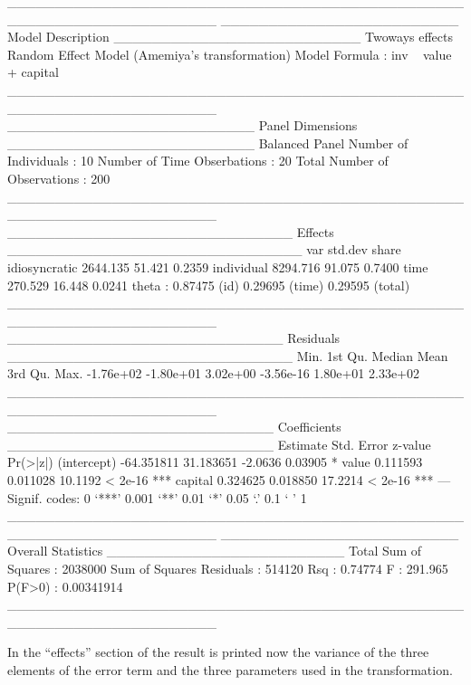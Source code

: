 \documentclass{article}
\begin{document}
\begin{Schunk}
\begin{Soutput}
______________________________________________________________________ 
_________________________ Model Description __________________________
Twoways effects
Random Effect Model (Amemiya's transformation)
Model Formula            : inv ~ value + capital
______________________________________________________________________ 
__________________________ Panel Dimensions __________________________
Balanced Panel
Number of Individuals        :  10
Number of Time Obserbations  :  20
Total Number of Observations :  200
______________________________________________________________________ 
______________________________ Effects _______________________________
                   var  std.dev  share
idiosyncratic 2644.135   51.421 0.2359
individual    8294.716   91.075 0.7400
time           270.529   16.448 0.0241
theta  : 0.87475 (id) 0.29695 (time) 0.29595 (total)
______________________________________________________________________ 
_____________________________ Residuals ______________________________
     Min.   1st Qu.    Median      Mean   3rd Qu.      Max. 
-1.76e+02 -1.80e+01  3.02e+00 -3.56e-16  1.80e+01  2.33e+02 
______________________________________________________________________ 
____________________________ Coefficients ____________________________
              Estimate Std. Error z-value Pr(>|z|)    
(intercept) -64.351811  31.183651 -2.0636  0.03905 *  
value         0.111593   0.011028 10.1192  < 2e-16 ***
capital       0.324625   0.018850 17.2214  < 2e-16 ***
---
Signif. codes:  0 ‘***’ 0.001 ‘**’ 0.01 ‘*’ 0.05 ‘.’ 0.1 ‘ ’ 1 
______________________________________________________________________ 
_________________________ Overall Statistics _________________________
Total Sum of Squares       : 2038000
Sum of Squares Residuals   : 514120
Rsq                        : 0.74774
F                          : 291.965
P(F>0)                     : 0.00341914
______________________________________________________________________ 
\end{Soutput}
\end{Schunk}

In the ``effects'' section of the result is printed now the variance
of the three elements of the error term and the three parameters used
in the transformation. 
\end{document}
